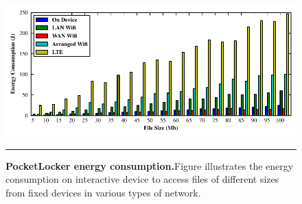 \begin{figure}[t]
  \centering
  \includegraphics[width=\textwidth]{./figures/energyconsumption.pdf}
  
  \vspace*{-0.1in}

  \caption{\small \textbf{PocketLocker energy consumption.}Figure illustrates the energy
  consumption on interactive device to access files of different sizes from
fixed devices in various types of network.}

  \label{fig-evaluation-energy}
  
  \vspace*{0.05in}

  \hrule

  \vspace*{-0.2in}

\end{figure}


